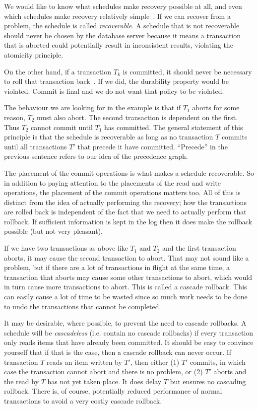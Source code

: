 We would like to know what schedules make recovery possible at all, and even which schedules make recovery relatively simple~\cite{fds}. If we can recover from a problem, the schedule is called \textit{recoverable}. A schedule that is not recoverable should never be chosen by the database server because it means a transaction that is aborted could potentially result in inconsistent results, violating the atomicity principle.

On the other hand, if a transaction $T_{k}$ is committed, it should never be necessary to roll that transaction back~\cite{fds}. If we did, the durability property would be violated. Commit is final and we do not want that policy to be violated.

The behaviour we are looking for in the example is that if $T_{1}$ aborts for some reason, $T_{2}$ must also abort. The second transaction is dependent on the first. Thus  $T_{2}$ cannot commit until $T_{1}$ has committed. The general statement of this principle is that the schedule is recoverable as long as no transaction $T$ commits until all transactions $T'$ that precede it have committed. ``Precede'' in the previous sentence refers to our idea of the precedence graph.

The placement of the commit operations is what makes a schedule recoverable. So in addition to paying attention to the placements of the read and write operations, the placement of the commit operations matters too. All of this is distinct from the idea of actually performing the recovery; how the transactions are rolled back is independent of the fact that we need to actually perform that rollback. If sufficient information is kept in the log then it does make the rollback possible (but not very pleasant).

If we have two transactions as above like $T_{1}$ and $T_{2}$ and the first transaction aborts, it may cause the second transaction to abort. That may not sound like a problem, but if there are a lot of transactions in flight at the same time, a transaction that aborts may cause some other transactions to abort, which would in turn cause more transactions to abort. This is called a cascade rollback. This can easily cause a lot of time to be wasted since so much work needs to be done to undo the transactions that cannot be completed.

It may be desirable, where possible, to prevent the need to cascade rollbacks. A schedule will be \textit{cascadeless} (i.e. contain no cascade rollbacks) if every transaction only reads items that have already been committed. It should be easy to convince yourself that if that is the case, then a cascade rollback can never occur. If transaction $T$ reads an item written by $T'$, then either (1) $T'$ commits, in which case the transaction cannot abort and there is no problem, or (2) $T'$ aborts and the read by $T$ has not yet taken place. It does delay $T$ but ensures no cascading rollback. There is, of course, potentially reduced performance of normal transactions to avoid a very costly cascade rollback. 

